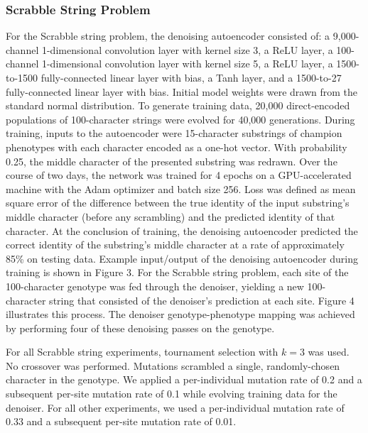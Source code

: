 \subsubsection{Scrabble String Problem}




For the Scrabble string problem, the denoising autoencoder consisted of: a 9,000-channel 1-dimensional convolution layer with kernel size 3, a ReLU layer, a 100-channel 1-dimensional convolution layer with kernel size 5, a ReLU layer, a 1500-to-1500 fully-connected linear layer with bias, a Tanh layer, and a 1500-to-27 fully-connected linear layer with bias.
Initial model weights were drawn from the standard normal distribution.
To generate training data, 20,000 direct-encoded populations of 100-character strings were evolved for 40,000 generations.
During training, inputs to the autoencoder were 15-character substrings of champion phenotypes with each character encoded as a one-hot vector.
With probability 0.25, the middle character of the presented substring was redrawn.
Over the course of two days, the network was trained for 4 epochs on a GPU-accelerated machine with the Adam optimizer and batch size 256.
Loss was defined as mean square error of the difference between the true identity of the input substring's middle character (before any scrambling) and the predicted identity of that character.
At the conclusion of training, the denoising autoencoder predicted the correct identity of the substring's middle character at a rate of approximately 85\% on testing data.
Example input/output of the denoising autoencoder during training is shown in Figure 3.
For the Scrabble string problem, each site of the 100-character genotype was fed through the denoiser, yielding a new 100-character string that consisted of the denoiser's prediction at each site.
Figure 4 illustrates this process.
The denoiser genotype-phenotype mapping was achieved by performing four of these denoising passes on the genotype.

For all Scrabble string experiments, tournament selection with $k = 3$ was used.
No crossover was performed.
Mutations scrambled a single, randomly-chosen character in the genotype.
We applied a per-individual mutation rate of 0.2 and a subsequent per-site mutation rate of 0.1 while evolving training data for the denoiser.
For all other experiments, we used a per-individual mutation rate of 0.33 and a subsequent per-site mutation rate of 0.01.

